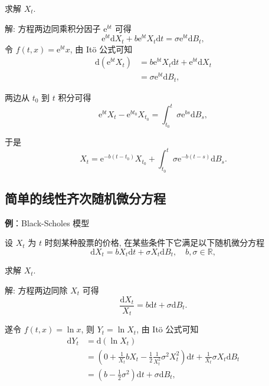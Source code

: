 \documentclass[openany]{ctexbook}
\theoremstyle{kaiti}
\theoremstyle{normal}
\begin{document}
求解 $X_t$.

解: 方程两边同乘积分因子 $\mathrm{e}^{b t}$ 可得
\begin{equation}
  \mathrm{e}^{b t}\mathrm{d}X_t+b\mathrm{e}^{b t} X_t\mathrm{d}t=\sigma\mathrm{e}^{b t}\mathrm{d}B_t,
\end{equation}
令 $f(t,x)=\mathrm{e}^{b t}x$, 由 It\"o 公式可知
\begin{equation}
  \begin{aligned}
  \mathrm{d}(\mathrm{e}^{b t}X_t)
  &=b\mathrm{e}^{b t} X_t\mathrm{d}t+\mathrm{e}^{b t}\mathrm{d}X_t\\
  &=\sigma\mathrm{e}^{b t}\mathrm{d}B_t,
  \end{aligned}
\end{equation}

两边从 $t_0$ 到 $t$ 积分可得
\begin{equation}
  \mathrm{e}^{b t}X_t-\mathrm{e}^{b t_0}X_{t_0}=\int_{t_0}^t\sigma\mathrm{e}^{b s}\mathrm{d}B_s,
\end{equation}

于是
\begin{equation}
  X_t=\mathrm{e}^{-b (t-t_0)}X_{t_0}+\int_{t_0}^t\sigma\mathrm{e}^{-b (t-s)}\mathrm{d}B_s.
\end{equation}

\subsection{简单的线性齐次随机微分方程}

\textbf{例}：Black-Scholes 模型

设 $X_t$ 为 $t$ 时刻某种股票的价格, 在某些条件下它满足以下随机微分方程
\begin{equation}
  \mathrm{d}X_t=b X_t\mathrm{d}t+\sigma X_t\mathrm{d}B_t,\quad b,\sigma\in\mathbb{R},
\end{equation}

求解 $X_t$.

解: 方程两边同除 $X_t$ 可得
\begin{equation}
  \frac{\mathrm{d}X_t}{X_t}=b \mathrm{d}t+\sigma \mathrm{d}B_t.
\end{equation}

遂令 $f(t,x)=\ln x$, 则 $Y_t=\ln X_t$, 由 It\"o 公式可知
\begin{equation}
  \begin{aligned}
    \mathrm{d}Y_t
    &=\mathrm{d}(\ln X_t)\\
    &=\left(0+\frac{1}{X_t}b X_t-\frac{1}{2}\frac{1}{X_t^2}\sigma^2 X_t^2\right)\mathrm{d}t+\frac{1}{X_t}\sigma X_t\mathrm{d}B_t\\
    &=\left(b-\frac{1}{2}\sigma^2\right)\mathrm{d}t+\sigma\mathrm{d}B_t,\\
  \end{aligned}
\end{equation}
\end{document}
